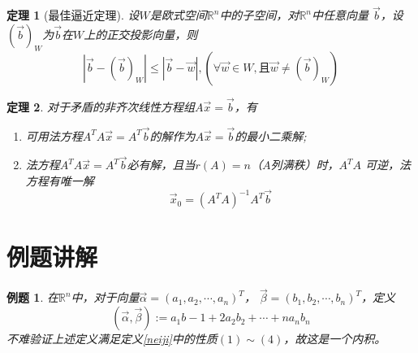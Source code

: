 \documentclass[a4paper]{book}
\newtheorem{thm}{定理}[chapter]
\newtheorem{eg}{例题}[chapter]
\begin{document}
\begin{thm}[最佳逼近定理]
设$W$是欧式空间$\mathbb{R}^n$中的子空间，对$\mathbb{R}^n$中任意向量
$\vec{b}$，设$(\vec{b})_{W}$为$\vec{b}$在$W$上的正交投影向量，则
\begin{equation*}
|\vec{b}-(\vec{b})_{W}|\leq|\vec{b}-\vec{w}|,(\forall\vec{w}\in W,
\text{且}\vec{w}\neq (\vec{b})_{W})
\end{equation*}
\end{thm}

\begin{thm}
对于矛盾的非齐次线性方程组$A\vec{x}=\vec{b}$，有
\begin{enumerate}
\item 可用法方程$A^TA\vec{x}=A^T\vec{b}$的解作为$A\vec{x}=\vec{b}$的最小二乘解;
\item 法方程$A^TA\vec{x}=A^T\vec{b}$必有解，且当$r(A)=n$（$A$列满秩）时，$A^TA$
可逆，法方程有唯一解
\begin{equation*}
\vec{x}_0=(A^TA)^{-1}A^T\vec{b}
\end{equation*}
\end{enumerate}
\end{thm}


\section{例题讲解}

\begin{eg}
在$\mathbb{R}^n$中，对于向量$\vec{\alpha}=(a_1,a_2,\cdots,a_n)^T$，
$\vec{\beta}=(b_1,b_2,\cdots,b_n)^T$，定义
\begin{equation*}
(\vec{\alpha},\vec{\beta}):=a_1b-1+2a_2b_2+\cdots+na_nb_n
\end{equation*}
不难验证上述定义满足定义\ref{neiji}中的性质$(1)\sim(4)$，故这是一个内积。
\end{eg}
\end{document}
